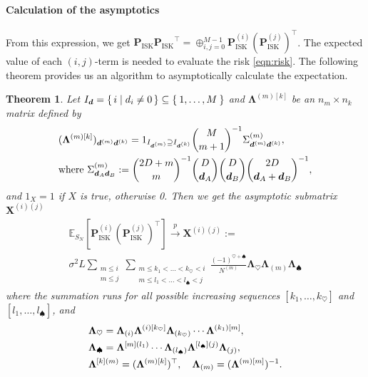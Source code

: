 \documentclass[letterpaper]{article} %
\theoremstyle{plain}
\newtheorem{theorem}{Theorem}
\newcommand{\sqbra}[1]{\left[#1 \right]}
\newcommand{\E}{\mathbb{E}}
\newcommand{\ZZ}{\Sigma}
\begin{document}
\paragraph{Calculation of the asymptotics}
From this expression, we get ${\bm P_\mathrm{ISK}} {\bm P_\mathrm{ISK}}^\top = \oplus_{i, j = 0}^{M - 1} {\bm P}^{(i)}_\mathrm{ISK} ({\bm P}^{(j)}_\mathrm{ISK})^\top$.
The expected value of each $(i, j)$-term is needed to evaluate the risk \cref{eqn:risk}.
The following theorem provides us an algorithm to asymptotically calculate the expectation.
\begin{theorem}
Let $I_{\bm d} = \set{i | d_i \neq 0} \subseteq \Set{1, \dots, M}$ and $\bm \Lambda^{(m) [k]}$ be an $n_m \times n_k$ matrix defined by
\begin{align}
    &({\bm \Lambda}^{(m) [k]})_{ \bm d ^{(m)} \bm d ^{(k)} }
    =
    1_{I_{\bm d^{(m)}}\supseteq I_{\bm d^{(k)}}}
    \binom{M}{m + 1}^{-1}
    \ZZ^{(m)}_{\bm d^{(m)} \bm d^{(k)}}
    , \notag
    \\
    &
    \text{where }
    \ZZ_{\bm d_A \bm d_B}^{(m)}
    :=
    \binom{2D + m}{m}^{-1}
    \binom{D}{\bm d_A}
    \binom{D}{\bm d_B}
    \binom{2D}{\bm d_A + \bm d_B}^{-1},
    \notag
\end{align}
and $1_{X} = 1$ if $X$ is true, otherwise 0.
Then we get the asymptotic submatrix $\bm X^{(i)(j)}$
\begin{multline}
    \E_{S_N}
    \sqbra{
    {\bm P}^{(i)}_\mathrm{ISK}
    ({\bm P}^{(j)}_\mathrm{ISK})^\top
    }
    \overset{p}{\to} \bm X^{(i)(j)}:=
    \\
    \sigma^2 L
    \sum_{
    \substack{
    m \leq i
    \\
    m \leq j
    }}
    \sum_{
    \substack{
    m \leq k_1 < \dots < k_{\heartsuit} < i
    \\
    m \leq l_1 < \dots < l_{\spadesuit} < j
    }
    }
    \frac{(-1)^{\heartsuit + \spadesuit}}{N^{(m)}}
    {\bm \Lambda}_{\heartsuit}
    \bm \Lambda_{(m)}
    {\bm \Lambda}_{\spadesuit}
    \label{eqn:P_OLS-P_OLS}
\end{multline}
where the summation runs for all possible increasing sequences $[k_1, \dots, k_\heartsuit]$ and $[l_1, \dots, l_\spadesuit]$, and
\begin{align}
    &{\bm \Lambda}_{\heartsuit}=
    {\bm \Lambda}_{(i)}
    {\bm \Lambda}^{(i) [k_{\heartsuit}]}
    {\bm \Lambda}_{(k_{\heartsuit})}
    \cdots
    {\bm \Lambda}^{(k_1) [m]}
    ,\notag\\
    &{\bm \Lambda}_{\spadesuit}=
    {\bm \Lambda}^{[m](l_1)}
    \cdots
    {\bm \Lambda}_{(l_{\spadesuit})}
    {\bm \Lambda}^{[l_{\spadesuit}](j)}
    {\bm \Lambda}_{(j)}
    ,\notag \\
    &{\bm \Lambda}^{[k](m)}
    =
    ({\bm \Lambda}^{(m) [k]})^\top,
    \quad
    {\bm \Lambda}_{(m)}
    =
    ({\bm \Lambda}^{(m) [m]})^{-1}
    .
    \label{eqn:Lamb}
\end{align}
\end{theorem}
\end{document}
